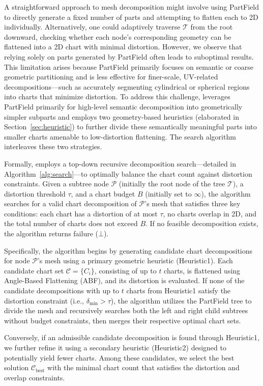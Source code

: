 A straightforward approach to mesh decomposition might involve using PartField to directly generate a fixed number of parts and attempting to flatten each to 2D individually. Alternatively, one could adaptively traverse $\mathcal{T}$ from the root downward, checking whether each node’s corresponding geometry can be flattened into a 2D chart with minimal distortion. However, we observe that relying solely on parts generated by PartField often leads to suboptimal results. This limitation arises because PartField primarily focuses on semantic or coarse geometric partitioning and is less effective for finer-scale, UV-related decompositions—such as accurately segmenting cylindrical or spherical regions into charts that minimize distortion. To address this challenge, \ourmodel leverages PartField primarily for high-level semantic decomposition into geometrically simpler subparts and employs two geometry-based heuristics (elaborated in Section~\ref{sec:heuristic}) to further divide these semantically meaningful parts into smaller charts amenable to low-distortion flattening. The search algorithm interleaves these two strategies.

Formally, \ourmodel employs a top-down recursive decomposition search—detailed in Algorithm~\ref{alg:search}—to optimally balance the chart count against distortion constraints. Given a subtree node $\mathcal{P}$ (initially the root node of the tree $\mathcal{T}$), a distortion threshold $\tau$, and a chart budget $B$ (initially set to $\infty$), the algorithm searches for a valid chart decomposition of $\mathcal{P}$'s mesh that satisfies three key conditions: each chart has a distortion of at most $\tau$, no charts overlap in 2D, and the total number of charts does not exceed $B$. If no feasible decomposition exists, the algorithm returns failure ($\bot$).

Specifically, the algorithm begins by generating candidate chart decompositions for node $\mathcal{P}$'s mesh using a primary geometric heuristic (Heuristic1). Each candidate chart set $\mathscr{C} = \{C_i\}$, consisting of up to $t$ charts, is flattened using Angle-Based Flattening (ABF), and its distortion is evaluated. If none of the candidate decompositions with up to $t$ charts from Heuristic1 satisfy the distortion constraint (i.e., $\delta_{\min} > \tau$), the algorithm utilizes the PartField tree to divide the mesh and recursively searches both the left and right child subtrees without budget constraints, then merges their respective optimal chart sets.

Conversely, if an admissible candidate decomposition is found through Heuristic1, we further refine it using a secondary heuristic (Heuristic2) designed to potentially yield fewer charts. Among these candidates, we select the best solution $\mathscr{C}_{\text{best}}$ with the minimal chart count that satisfies the distortion and overlap constraints.

